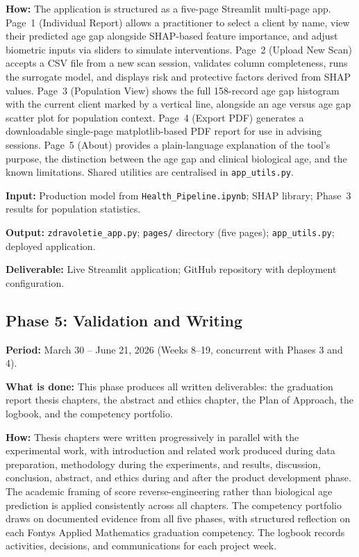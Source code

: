 \documentclass[11pt,a4paper]{article}
\begin{document}
\textbf{How:} The application is structured as a five-page Streamlit multi-page app. Page~1 (Individual Report) allows a practitioner to select a client by name, view their predicted age gap alongside SHAP-based feature importance, and adjust biometric inputs via sliders to simulate interventions. Page~2 (Upload New Scan) accepts a CSV file from a new scan session, validates column completeness, runs the surrogate model, and displays risk and protective factors derived from SHAP values. Page~3 (Population View) shows the full 158-record age gap histogram with the current client marked by a vertical line, alongside an age versus age gap scatter plot for population context. Page~4 (Export PDF) generates a downloadable single-page matplotlib-based PDF report for use in advising sessions. Page~5 (About) provides a plain-language explanation of the tool's purpose, the distinction between the age gap and clinical biological age, and the known limitations. Shared utilities are centralised in \texttt{app\_utils.py}.

\textbf{Input:} Production model from \texttt{Health\_Pipeline.ipynb}; SHAP library; Phase~3 results for population statistics.

\textbf{Output:} \texttt{zdravoletie\_app.py}; \texttt{pages/} directory (five pages); \texttt{app\_utils.py}; deployed application.

\textbf{Deliverable:} Live Streamlit application; GitHub repository with deployment configuration.

\subsection{Phase 5: Validation and Writing}

\textbf{Period:} March 30 -- June 21, 2026 (Weeks 8--19, concurrent with Phases 3 and 4).

\textbf{What is done:} This phase produces all written deliverables: the graduation report thesis chapters, the abstract and ethics chapter, the Plan of Approach, the logbook, and the competency portfolio.

\textbf{How:} Thesis chapters were written progressively in parallel with the experimental work, with introduction and related work produced during data preparation, methodology during the experiments, and results, discussion, conclusion, abstract, and ethics during and after the product development phase. The academic framing of score reverse-engineering rather than biological age prediction is applied consistently across all chapters. The competency portfolio draws on documented evidence from all five phases, with structured reflection on each Fontys Applied Mathematics graduation competency. The logbook records activities, decisions, and communications for each project week.
\end{document}
